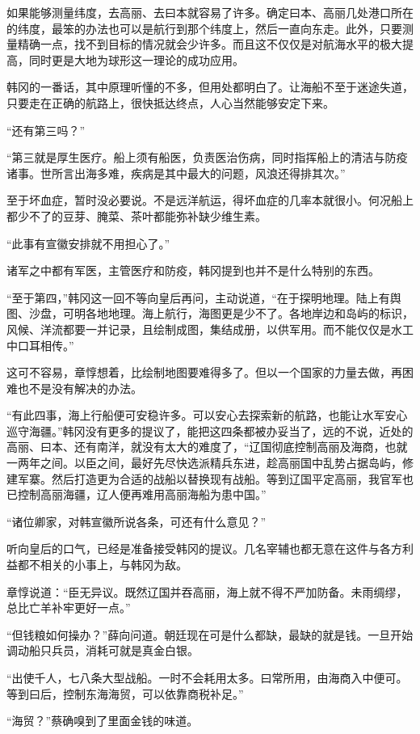 如果能够测量纬度，去高丽、去曰本就容易了许多。确定曰本、高丽几处港口所在的纬度，最笨的办法也可以是航行到那个纬度上，然后一直向东走。此外，只要测量精确一点，找不到目标的情况就会少许多。而且这不仅仅是对航海水平的极大提高，同时更是大地为球形这一理论的成功应用。

韩冈的一番话，其中原理听懂的不多，但用处都明白了。让海船不至于迷途失道，只要走在正确的航路上，很快抵达终点，人心当然能够安定下来。

“还有第三吗？”

“第三就是厚生医疗。船上须有船医，负责医治伤病，同时指挥船上的清洁与防疫诸事。世所言出海多难，疾病是其中最大的问题，风浪还得排其次。”

至于坏血症，暂时没必要说。不是远洋航运，得坏血症的几率本就很小。何况船上都少不了的豆芽、腌菜、茶叶都能弥补缺少维生素。

“此事有宣徽安排就不用担心了。”

诸军之中都有军医，主管医疗和防疫，韩冈提到也并不是什么特别的东西。

“至于第四，”韩冈这一回不等向皇后再问，主动说道，“在于探明地理。陆上有舆图、沙盘，可明各地地理。海上航行，海图更是少不了。各地岸边和岛屿的标识，风候、洋流都要一并记录，且绘制成图，集结成册，以供军用。而不能仅仅是水工中口耳相传。”

这可不容易，章惇想着，比绘制地图要难得多了。但以一个国家的力量去做，再困难也不是没有解决的办法。

“有此四事，海上行船便可安稳许多。可以安心去探索新的航路，也能让水军安心巡守海疆。”韩冈没有更多的提议了，能把这四条都被办妥当了，远的不说，近处的高丽、曰本、还有南洋，就没有太大的难度了，“辽国彻底控制高丽及海商，也就一两年之间。以臣之间，最好先尽快选派精兵东进，趁高丽国中乱势占据岛屿，修建军寨。然后打造更为合适的战船以替换现有战船。等到辽国平定高丽，我官军也已控制高丽海疆，辽人便再难用高丽海船为患中国。”

“诸位卿家，对韩宣徽所说各条，可还有什么意见？”

听向皇后的口气，已经是准备接受韩冈的提议。几名宰辅也都无意在这件与各方利益都不相关的小事上，与韩冈为敌。

章惇说道：“臣无异议。既然辽国并吞高丽，海上就不得不严加防备。未雨绸缪，总比亡羊补牢更好一点。”

“但钱粮如何操办？”薛向问道。朝廷现在可是什么都缺，最缺的就是钱。一旦开始调动船只兵员，消耗可就是真金白银。

“出使千人，七八条大型战船。一时不会耗用太多。曰常所用，由海商入中便可。等到曰后，控制东海海贸，可以依靠商税补足。”

“海贸？”蔡确嗅到了里面金钱的味道。

